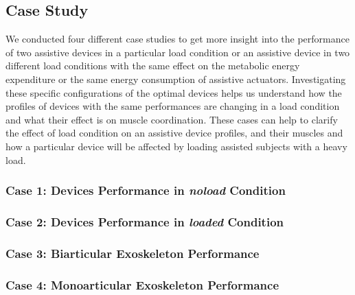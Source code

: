 \documentclass[10pt,letterpaper]{article}
\begin{document}
\subsection*{Case Study}
We conducted four different case studies to get more insight into the performance of two assistive devices in a particular load condition or an assistive device in two different load conditions with the same effect on the metabolic energy expenditure or the same energy consumption of assistive actuators. Investigating these specific configurations of the optimal devices helps us understand how the profiles of devices with the same performances are changing in a load condition and what their effect is on muscle coordination. These cases can help to clarify the effect of load condition on an assistive device profiles, and their muscles and how a particular device will be affected by loading assisted subjects with a heavy load.
\subsubsection*{Case 1: Devices Performance in \textit{\textit{noload}} Condition} 
\subsubsection*{Case 2: Devices Performance in \textit{\textit{loaded}} Condition} 
\subsubsection*{Case 3: Biarticular Exoskeleton Performance} 
\subsubsection*{Case 4: Monoarticular Exoskeleton Performance}
\end{document}
